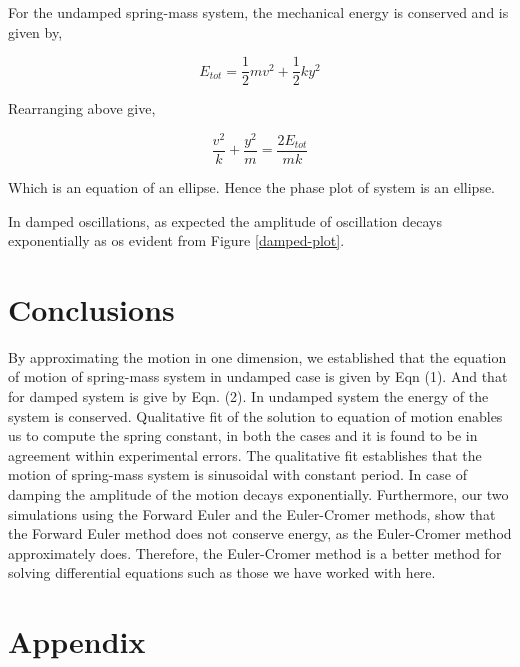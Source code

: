 \documentclass[letterpaper,12pt]{article}
\begin{document}
For the undamped spring-mass system, the mechanical energy is conserved and is given by,

$$E_{tot} = \frac{1}{2}mv^2 + \frac{1}{2}ky^2$$

Rearranging above give,

$$\frac{v^2}{k} + \frac{y^2}{m} = \frac{2E_{tot}}{mk}$$

Which is an equation of an ellipse. Hence the phase plot of system is an ellipse.

In damped oscillations, as expected the amplitude of oscillation decays exponentially as os evident
from Figure \ref{damped-plot}.

\section{Conclusions}

By approximating the motion in one dimension, we established that the equation of motion of spring-mass 
system in undamped case is given by Eqn (1). And that for damped system is give by Eqn. (2). In undamped 
system the energy of the system is conserved. Qualitative fit of the solution to equation of motion 
enables us to compute the spring constant, in both the cases and it is found to be in agreement within experimental errors.
The qualitative fit establishes that the motion of spring-mass system is sinusoidal with constant period. In 
case of damping the amplitude of the motion decays exponentially. Furthermore, our two simulations using the Forward Euler and the Euler-Cromer methods, show that the Forward Euler method does not conserve energy, as the Euler-Cromer method approximately does. Therefore, the Euler-Cromer method is a better method for solving differential equations such as those we have worked with here.

\pagebreak

\appendix

\section{Appendix}
\end{document}
